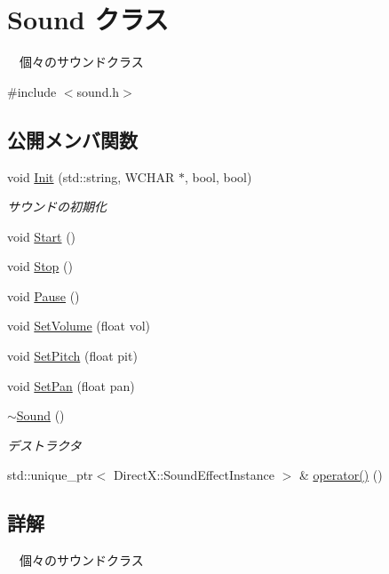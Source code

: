 \hypertarget{class_sound}{}\section{Sound クラス}
\label{class_sound}


　個々のサウンドクラス  




{\ttfamily \#include $<$sound.\+h$>$}

\subsection*{公開メンバ関数}
\begin{DoxyCompactItemize}
\item 
void \mbox{\hyperlink{class_sound_a341bf468ea414e896daf3a5f7937ee12}{Init}} (std\+::string, W\+C\+H\+AR $\ast$, bool, bool)
\begin{DoxyCompactList}\small\item\em サウンドの初期化 \end{DoxyCompactList}\item 
void \mbox{\hyperlink{class_sound_ae021b518e93d7d8c6f3ea951cd4b98d8}{Start}} ()
\item 
void \mbox{\hyperlink{class_sound_a188de6836d531813da378464e392e813}{Stop}} ()
\item 
void \mbox{\hyperlink{class_sound_a4e199b4346519a4977fe94998c4a77e7}{Pause}} ()
\item 
void \mbox{\hyperlink{class_sound_a993eee69f61611ca1b4621ea0952e2c8}{Set\+Volume}} (float vol)
\item 
void \mbox{\hyperlink{class_sound_a06b9680efb2b6b41b52d9f25ac0264f1}{Set\+Pitch}} (float pit)
\item 
void \mbox{\hyperlink{class_sound_a1b066e78405656b1475849139ca24dce}{Set\+Pan}} (float pan)
\item 
\mbox{\hyperlink{class_sound_a0907389078bf740be2a5763366ad3376}{$\sim$\+Sound}} ()
\begin{DoxyCompactList}\small\item\em デストラクタ \end{DoxyCompactList}\item 
std\+::unique\+\_\+ptr$<$ Direct\+X\+::\+Sound\+Effect\+Instance $>$ \& \mbox{\hyperlink{class_sound_a0d79b20f421c0020c53b08c05b6df25b}{operator()}} ()
\end{DoxyCompactItemize}


\subsection{詳解}
　個々のサウンドクラス 

